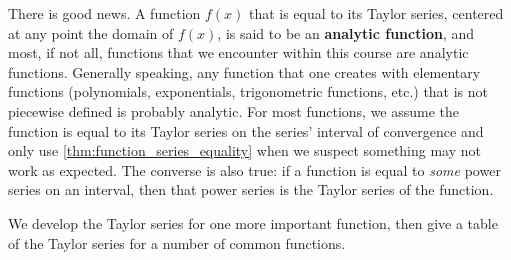 There is good news. A function $f(x)$ that is equal to its Taylor series, centered at any point the domain of $f(x)$, is said to be an \textbf{analytic function}, and most, if not all, functions that we encounter within this course are analytic functions. Generally speaking, any function that one creates with elementary functions (polynomials, exponentials, trigonometric functions, etc.) that is not piecewise defined is probably analytic. For most functions, we assume the function is equal to its Taylor series on the series' interval of convergence and only use \autoref{thm:function_series_equality} when we suspect something may not work as expected.  The converse is also true: if a function is equal to \emph{some} power series on an interval, then that power series is the Taylor series of the function.

We develop the Taylor series for one more important function, then give a table of the Taylor series for a number of common functions.

